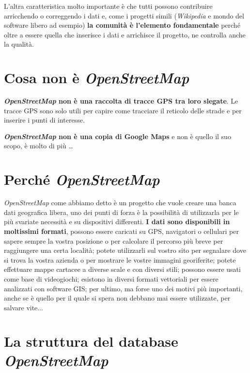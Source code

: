 \documentclass[a4paper,twoside,12pt,]{article}
\newcommand{\osm}{\emph{OpenStreetMap}\xspace}
\newcommand{\gps}{GPS\xspace}
\newcommand{\pro}[1]{\emph{#1}}
\begin{document}
L'altra caratteristica molto importante è che tutti possono contribuire arricchendo o correggendo i dati e, come i progetti simili (\pro{Wikipedia} e mondo del software libero ad esempio) \textbf{la comunità è l'elemento fondamentale} perché oltre a essere quella che inserisce i dati e arrichisce il progetto, ne controlla anche la qualità.
\section{Cosa non è \osm}
\textbf{\osm non è una raccolta di tracce \gps tra loro slegate}. Le tracce \gps sono solo utili per capire come tracciare il reticolo delle strade e per inserire i punti di interesse.

\textbf{\osm non è una copia di Google Maps} e non è quello il suo scopo, è molto di più \dots

\section{Perché \osm}
\osm come abbiamo detto è un progetto che vuole creare una banca dati geografica libera, uno dei punti di forza è la possibilità di utilizzarla per le più svariate necessità e su  dispositivi differenti. \textbf{I dati sono disponibili in moltissimi formati}, possono essere caricati su GPS, navigatori o cellulari per sapere sempre la vostra posizione o per calcolare il percorso più breve per raggiungere una certa località; potete utilizzarli sul vostro sito per segnalare dove si trova la vostra azienda o per mostrare le vostre immagini georiferite; potete effettuare mappe cartacee a diverse scale e con diversi stili; possono essere usati come base di videogiochi; esistono in diversi formati vettoriali per essere analizzati con software GIS; per ultimo, ma forse uno dei motivi più importanti, anche se è quello per il quale si spera non debbano mai essere utilizzate, per salvare vite...

\section{La struttura del database \osm}
\end{document}
